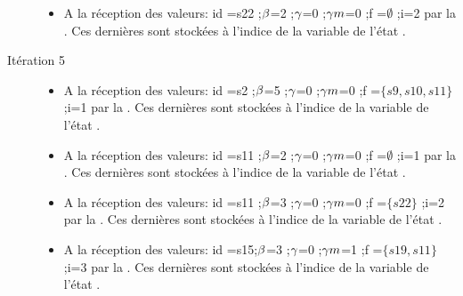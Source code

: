 \begin{Exemple}
\begin{description}
\begin{itemize}
			\item  A la réception des valeurs: id =s22 ;$\beta{}$=2 ;$\gamma{}$=0 ;$\gamma m{}$=0 ;f =$\emptyset$ ;i=2 par la \mtwo{}. Ces dernières sont stockées à l'indice  de la variable   de l'état .
			\end{itemize}
			\item[Itération 5]
		\begin{itemize}
		\item  A la réception des valeurs: id =s2 ;$\beta{}$=5 ;$\gamma{}$=0 ;$\gamma m{}$=0 ;f =$\{s9,s10,s11\}$ ;i=1 par la \mtree{}. Ces dernières sont stockées à l'indice  de la variable   de l'état .
			\item  A la réception des valeurs: id =s11 ;$\beta{}$=2 ;$\gamma{}$=0 ;$\gamma m{}$=0 ;f =$\emptyset$ ;i=1 par la \mtwo{}. Ces dernières sont stockées à l'indice  de la variable   de l'état .
			\item  A la réception des valeurs: id =s11 ;$\beta{}$=3 ;$\gamma{}$=0 ;$\gamma m{}$=0 ;f =$\{s22\}$ ;i=2 par la \mtwo{}. Ces dernières sont stockées à l'indice  de la variable   de l'état .
			\item A la réception des valeurs: id =s15;$\beta{}$=3 ;$\gamma{}$=0 ;$\gamma m{}$=1 ;f =$\{s19,s11\}$ ;i=3	 par la \mtwo{}. Ces dernières sont stockées à l'indice  de la variable   de l'état .
			\end{itemize}	
	\end{description}
\end{Exemple}